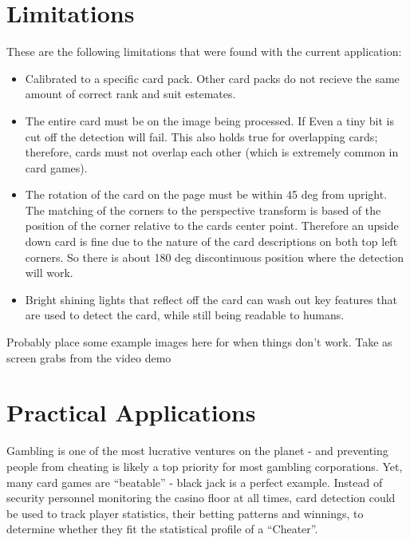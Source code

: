\documentclass[conference]{IEEEtran}
\begin{document}
\section{Limitations}
These are the following limitations that were found with the current application:
\begin{itemize}
\item Calibrated to a specific card pack. Other card packs do not recieve the same amount of correct
        rank and suit estemates.
\item The entire card must be on the image being processed. If Even a tiny bit is cut off the
        detection will fail. This also holds true for overlapping cards; therefore, cards must not
        overlap each other (which is extremely common in card games).
\item The rotation of the card on the page must be within 45 deg from upright. The matching of the
        corners to the perspective transform is based of the position of the corner relative to the
        cards center point. Therefore an upside down card is fine due to the nature of the card
        descriptions on both top left corners. So there is about 180 deg discontinuous position
        where the detection will work.
\item Bright shining lights that reflect off the card can wash out key features that are used to
        detect the card, while still being readable to humans.
\end{itemize}

Probably place some example images here for when things don't work. Take as screen grabs from the
video demo


\section{Practical Applications}
Gambling is one of the most lucrative ventures on the planet - and preventing people from cheating
is likely a top priority for most gambling corporations. Yet, many card games are ``beatable'' - black
jack is a perfect example. Instead of security personnel monitoring the casino floor at all times,
card detection could be used to track player statistics, their betting patterns and winnings, to
determine whether they fit the statistical profile of a ``Cheater''.
\end{document}
